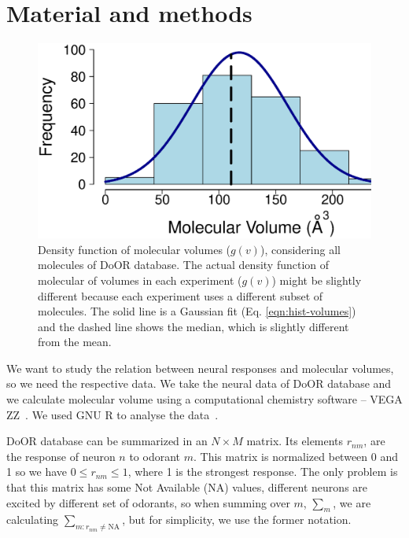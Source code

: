 \documentclass[11pt]{paper} %
\begin{document}
 

\section{Material and methods}
\begin{figure}
	\centering
	\includegraphics[width=0.5 \textwidth]{fig/hist-volumes}
	\caption{Density function of molecular volumes ($g(v)$), considering all molecules of DoOR database. 
		The actual density function of molecular of volumes in each experiment ($g(v)$) might be slightly different 
		because each experiment uses a different subset of molecules. 
		The solid line is a Gaussian fit (Eq. \ref{eqn:hist-volumes}) and the dashed line shows the median, 
		which is slightly different from 		the mean.}
	\label{fig:hist-volumes}
\end{figure}

We want to study the relation between neural responses and molecular volumes, so we need the respective data. 
We take the neural data of DoOR database \cite{Galizia2010} and we calculate molecular volume using a computational chemistry software -- VEGA ZZ~\cite{Pedretti2004}. 
We used  GNU R to analyse the data~\cite{Rlanguage}.

DoOR database can be summarized in an $N\times M$ matrix. 
Its elements $r_{nm}$, are the response of neuron $n$ to odorant $m$. 
This matrix is normalized between 0 and 1 so we have $0 \le r_{nm} \le 1$, where 1 is the strongest response.
The only problem is that this matrix has some Not Available (NA) values, 
different neurons are excited by different set of odorants, 
so  when summing over $m$, $\sum_m$, we are calculating $\sum_{m: r_{nm} \neq \text{NA}}$, but for simplicity, 
we use the former notation. 
\end{document}
